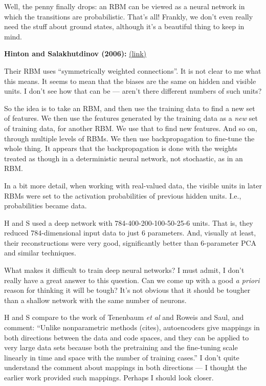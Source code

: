 \documentclass[12pt]{article}
\newcommand{\link}[2]{\href{#1}{#2}}
\begin{document}
Well, the penny finally drops: an RBM can be viewed as a neural
network in which the transitions are probabilistic.  That's all!
Frankly, we don't even really need the stuff about ground states,
although it's a beautiful thing to keep in mind.

\textbf{Hinton and Salakhutdinov (2006):}
\link{http://scholar.google.ca/scholar?cluster=15344645275208957628}{(link)}

Their RBM uses ``symmetrically weighted connections''.  It is not
clear to me what this means.  It seems to mean that the biases are the
same on hidden and visible units.  I don't see how that can be ---
aren't there different numbers of such units?

So the idea is to take an RBM, and then use the training data to find
a new set of features.  We then use the features generated by the
training data as a \emph{new} set of training data, for another RBM.
We use that to find new features.  And so on, through multiple levels
of RBMs.  We then use backpropagation to fine-tune the whole thing.
It appears that the backpropagation is done with the weights treated
as though in a deterministic neural network, not stochastic, as in an
RBM.

In a bit more detail, when working with real-valued data, the visible
units in later RBMs were set to the activation probabilities of
previous hidden units.  I.e., probabilities became data.

H and S used a deep network with 784-400-200-100-50-25-6 units.  That
is, they reduced 784-dimensional input data to just 6 parameters.
And, visually at least, their reconstructions were very good,
significantly better than 6-parameter PCA and similar techniques.

What makes it difficult to train deep neural networks?  I must admit,
I don't really have a great answer to this question.  Can we come up
with a good \emph{a priori} reason for thinking it will be tough?
It's not obvious that it should be tougher than a shallow network with
the same number of neurons.

H and S compare to the work of Tenenbaum \emph{et al} and Roweis and
Saul, and comment: ``Unlike nonparametric methods (cites),
autoencoders give mappings in both directions between the data and
code spaces, and they can be applied to very large data sets because
both the pretraining and the fine-tuning scale linearly in time and
space with the number of training cases.''  I don't quite understand
the comment about mappings in both directions --- I thought the
earlier work provided such mappings.  Perhaps I should look closer.
\end{document}
